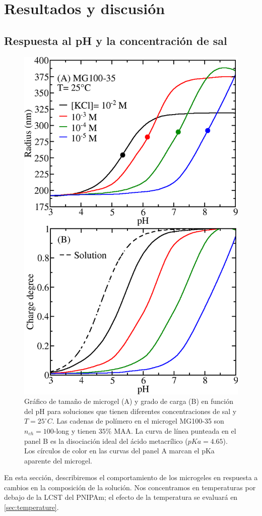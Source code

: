 \section{Resultados y discusi\'on}



\subsection{Respuesta al pH y la concentraci\'on de sal}\label{sec:pH_salt}


\begin{figure}[!ht]
\centering
\includegraphics[width=0.5\linewidth]{Figures/graph-gel/R-pH.png}
\caption{Gr\'afico de tama\~no de microgel (A) y grado de carga (B) en funci\'on del pH para soluciones que tienen diferentes concentraciones de sal y $T=25 ^\circ C$.
	Las cadenas de pol\'imero en el microgel MG100-35 son $n_{ch}=100$-long y tienen $35\% $ MAA.
	La curva de línea punteada en el panel B es la disociaci\'on ideal del \'acido metacr\'ilico ($pKa=4.65$).
	Los c\'irculos de color en las curvas del panel A marcan el pKa aparente del microgel.}
\label{fig:R-pH}
\end{figure}

En esta secci\'on, describiremos el comportamiento de los microgeles en respuesta a cambios en la composici\'on de la soluci\'on.
Nos concentramos en temperaturas por debajo de la LCST del PNIPAm;
el efecto de la temperatura se evaluar\'a en \ref{sec:temperature}.


